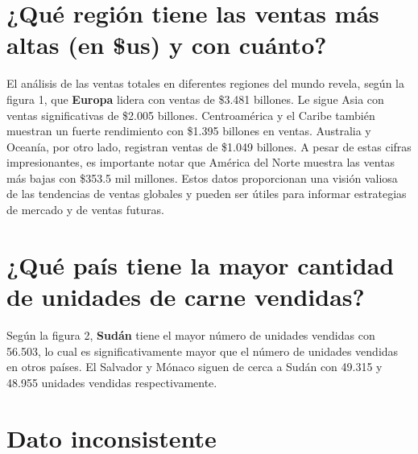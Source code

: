 \documentclass[10pt]{article}
\begin{document}
\begin{paracol}{2}
\section{¿Qué región tiene las ventas más altas (en \$us) y con cuánto?}
El análisis de las ventas totales en diferentes regiones del mundo revela, según la figura 1, que \textbf{Europa} lidera con ventas de \$3.481 billones. Le sigue Asia con ventas significativas de \$2.005 billones. Centroamérica y el Caribe también muestran un fuerte rendimiento con \$1.395 billones en ventas. Australia y Oceanía, por otro lado, registran ventas de \$1.049 billones. A pesar de estas cifras impresionantes, es importante notar que América del Norte muestra las ventas más bajas con \$353.5 mil millones. Estos datos proporcionan una visión valiosa de las tendencias de ventas globales y pueden ser útiles para informar estrategias de mercado y de ventas futuras.

\section{¿Qué país tiene la mayor cantidad de unidades de carne vendidas?}
\switchcolumn[0]\noindent
Según la figura 2, \textbf{Sudán} tiene el mayor número de unidades vendidas con 56.503, lo cual es significativamente mayor que el número de unidades vendidas en otros países. El Salvador y Mónaco siguen de cerca a Sudán con 49.315 y 48.955 unidades vendidas respectivamente. 

\section{Dato inconsistente}


\end{paracol}
\end{document}
